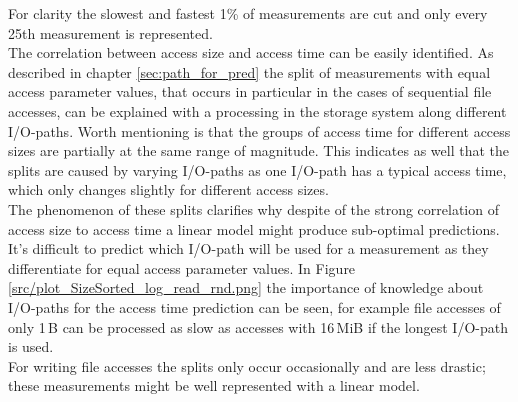 \documentclass{superfri}
\begin{document}

For clarity the slowest and fastest 1\% of measurements are cut and only every 25th measurement is represented.\\
The correlation between access size and access time can be easily identified.
As described in chapter \ref{sec:path_for_pred} the split of measurements with equal access parameter values, that occurs in particular in the cases of sequential file accesses, can be explained with a processing in the storage system along different I/O-paths.
Worth mentioning is that the groups of access time for different access sizes are partially at the same range of magnitude.
This indicates as well that the splits are caused by varying I/O-paths as one I/O-path has a typical access time, which only changes slightly for different access sizes.\\
The phenomenon of these splits clarifies why despite of the strong correlation of access size to access time a linear model might produce sub-optimal predictions. It's difficult to predict which I/O-path will be used for a measurement as they differentiate for equal access parameter values.
In Figure \ref{src/plot_SizeSorted_log_read_rnd.png} the importance of knowledge about I/O-paths for the  access time prediction can be seen, for example file accesses of only 1\,B can be processed as slow as accesses with 16\,MiB if the longest I/O-path is used.\\
For writing file accesses the splits only occur occasionally and are less drastic; these measurements might be well represented with a linear model.
\end{document}

